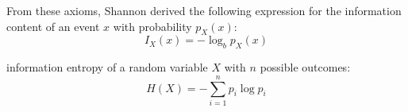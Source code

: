 From these axioms, Shannon derived the following expression for the information content of an event $x$ with probability $p_X(x)$:
\begin{equation}
    I_X(x) = -\log_b p_X(x)
\end{equation}



information entropy of a random variable $X$ with $n$ possible outcomes:
\begin{equation}
    H(X) = -\sum_{i=1}^n p_i \log p_i
\end{equation}












